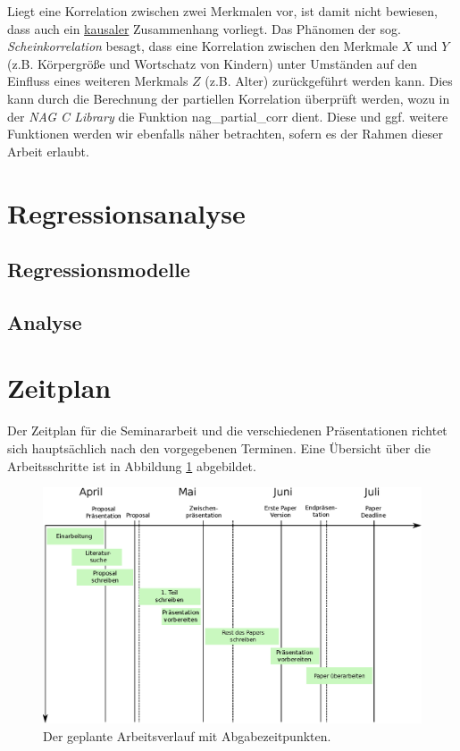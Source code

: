 \documentclass{article}
\begin{document}
Liegt eine Korrelation zwischen zwei Merkmalen vor, ist damit nicht bewiesen, dass auch ein \underline{kausaler} Zusammenhang vorliegt. Das Phänomen der sog. {\it Scheinkorrelation} besagt, dass eine Korrelation zwischen den Merkmale $X$ und $Y$ (z.B. Körpergröße und Wortschatz von Kindern) unter Umständen auf den Einfluss eines weiteren Merkmals $Z$ (z.B. Alter) zurückgeführt werden kann. Dies kann durch die Berechnung der partiellen Korrelation überprüft werden, wozu in der {\it NAG C Library} die Funktion nag\_partial\_corr dient. Diese und ggf. weitere Funktionen werden wir ebenfalls näher betrachten, sofern es der Rahmen dieser Arbeit erlaubt.

\section{Regressionsanalyse}

\subsection{Regressionsmodelle}

\subsection{Analyse}

\section{Zeitplan}

Der Zeitplan für die Seminararbeit und die verschiedenen Präsentationen richtet sich hauptsächlich nach den vorgegebenen Terminen.
Eine Übersicht über die Arbeitsschritte ist in Abbildung \ref{fig:Zeitplan} abgebildet.

\begin{figure}[t]
 \includegraphics[width=\linewidth]{./figures/Workplan-adj.eps}
 \caption{Der geplante Arbeitsverlauf mit Abgabezeitpunkten.}
 \label{fig:Zeitplan}
\end{figure}
\end{document}
